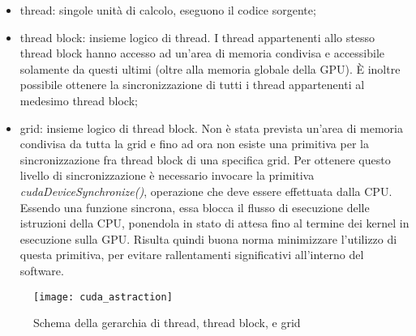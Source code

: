 \begin{itemize}
    \item
        thread: singole unità di calcolo, eseguono il codice sorgente;
    \item
        thread block: insieme logico di thread.
        I thread appartenenti
        allo stesso thread block hanno accesso ad un'area di memoria
        condivisa e accessibile solamente da questi ultimi
        (oltre alla memoria globale della GPU).
        È inoltre possibile ottenere la sincronizzazione di tutti i
        thread appartenenti al medesimo thread block;
    \item
        grid: insieme logico di thread block. Non è stata
        prevista un'area di memoria condivisa da tutta la grid
        e fino ad ora non esiste una primitiva per la sincronizzazione fra
        thread block di una specifica grid.
        Per ottenere questo livello di sincronizzazione è necessario
        invocare la primitiva \textit{cudaDeviceSynchronize()}, operazione
        che deve essere effettuata dalla CPU. Essendo una funzione sincrona,
        essa blocca il flusso di esecuzione delle istruzioni della CPU,
        ponendola in stato di attesa fino al termine dei kernel
        in esecuzione sulla GPU.
        Risulta quindi buona norma minimizzare l'utilizzo di questa primitiva,
        per evitare rallentamenti significativi all'interno del software.
\end{itemize}

\begin{figure}[t]
    \centering
    \texttt{[image: cuda\_astraction]}
    \caption{Schema della gerarchia di thread, thread block, e grid 
        \cite{nickolls2010gpu}}
    \label{fig:gpu-abstract-scheme}
\end{figure}

